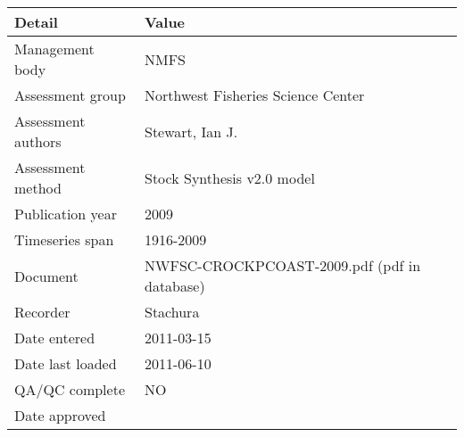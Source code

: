 \begin{table}[htb]
\centering
\begin{tabular}{lp{7cm}}
\toprule
Detail & Value \\
\midrule
Management body    & NMFS                                         \\
Assessment group   & Northwest Fisheries Science Center           \\
Assessment authors & Stewart, Ian J.                              \\
Assessment method  & Stock Synthesis v2.0 model                   \\
Publication year   & 2009                                         \\
Timeseries span    & 1916-2009                                    \\
Document           & NWFSC-CROCKPCOAST-2009.pdf (pdf in database) \\
Recorder           & Stachura                                     \\
Date entered       & 2011-03-15                                   \\
Date last loaded   & 2011-06-10                                   \\
QA/QC complete     & NO                                           \\
Date approved      &                                              \\
\bottomrule
\end{tabular}
\label{tab:assessdet}
\end{table}
